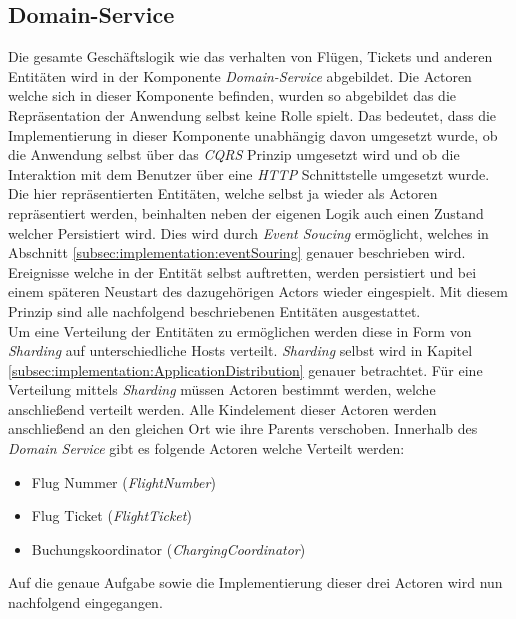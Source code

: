 \subsection{Domain-Service}
\label{subsec:implementation:domainService} 
Die gesamte Geschäftslogik wie das verhalten von Flügen, Tickets und anderen Entitäten wird in der Komponente \textit{Domain-Service}  abgebildet. Die Actoren welche sich in dieser Komponente befinden, wurden so abgebildet das die Repräsentation der Anwendung selbst keine Rolle spielt. Das bedeutet, dass die Implementierung in dieser Komponente unabhängig davon umgesetzt wurde, ob die Anwendung selbst über das \textit{CQRS} Prinzip umgesetzt wird und ob die Interaktion mit dem Benutzer über eine \textit{HTTP} Schnittstelle umgesetzt wurde. \\
Die hier repräsentierten Entitäten, welche selbst ja wieder als Actoren repräsentiert werden, beinhalten neben der eigenen Logik auch einen Zustand welcher Persistiert wird. Dies wird durch \textit{Event Soucing} ermöglicht, welches in Abschnitt \ref{subsec:implementation:eventSouring} genauer beschrieben wird. Ereignisse welche in der Entität selbst auftretten, werden persistiert und bei einem späteren Neustart des dazugehörigen Actors wieder eingespielt. Mit diesem Prinzip sind alle nachfolgend beschriebenen Entitäten ausgestattet. \\
Um eine Verteilung der Entitäten zu ermöglichen werden diese in Form von \textit{Sharding} auf unterschiedliche Hosts verteilt. \textit{Sharding} selbst wird in Kapitel \ref{subsec:implementation:ApplicationDistribution} genauer betrachtet. Für eine Verteilung mittels \textit{Sharding} müssen Actoren bestimmt werden, welche anschließend verteilt werden. Alle Kindelement dieser Actoren werden anschließend an den gleichen Ort wie ihre Parents verschoben. Innerhalb des \textit{Domain Service} gibt es folgende Actoren welche Verteilt werden:
\begin{itemize}
    \item Flug Nummer (\textit{FlightNumber})
    \item Flug Ticket (\textit{FlightTicket})
    \item Buchungskoordinator (\textit{ChargingCoordinator})
\end{itemize}
Auf die genaue Aufgabe sowie die Implementierung dieser drei Actoren wird nun nachfolgend eingegangen.

